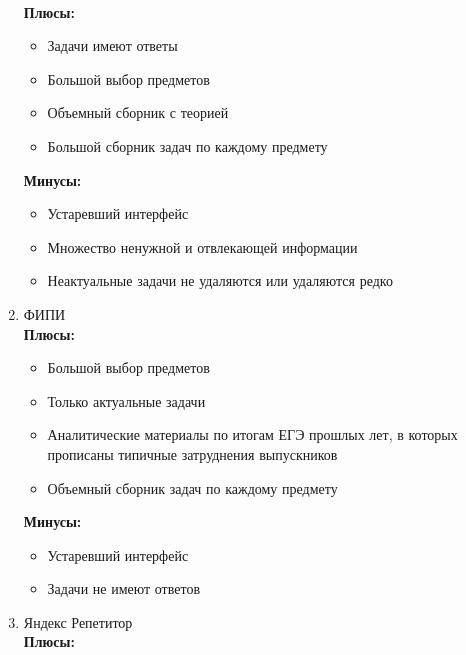 \documentclass[a4paper, 12pt]{extarticle}
\begin{document}
\begin{enumerate}
    \vspace{2mm}
    \\
    \textbf{Плюсы:}
    \vspace{-2mm}
    \begin{itemize}
        \item Задачи имеют ответы
        \item Большой выбор предметов
        \item Объемный сборник с теорией
        \item Большой сборник задач по каждому предмету
    \end{itemize}
    \textbf{Минусы:}
    \vspace{-2mm}
    \begin{itemize}
        \item Устаревший интерфейс
        \item Множество ненужной и отвлекающей информации
        \item Неактуальные задачи не удаляются или удаляются редко
    \end{itemize}
    \vspace{2mm}
    \item{\large ФИПИ}
    \vspace{2mm}
    \\
    \textbf{Плюсы:}
    \vspace{-2mm}
    \begin{itemize}
        \item Большой выбор предметов
        \item Только актуальные задачи
        \item Аналитические материалы по итогам ЕГЭ прошлых лет, в которых
            прописаны типичные затруднения выпускников
        \item Объемный сборник задач по каждому предмету
    \end{itemize}
    \textbf{Минусы:}
    \vspace{-2mm}
    \begin{itemize}
        \item Устаревший интерфейс
        \item Задачи не имеют ответов
    \end{itemize}
    \newpage
    \item{\large Яндекс Репетитор}
    \vspace{2mm}
    \\
    \textbf{Плюсы:}
    \vspace{-2mm}
    \begin{itemize}

\end{itemize}
\end{enumerate}
\end{document}
